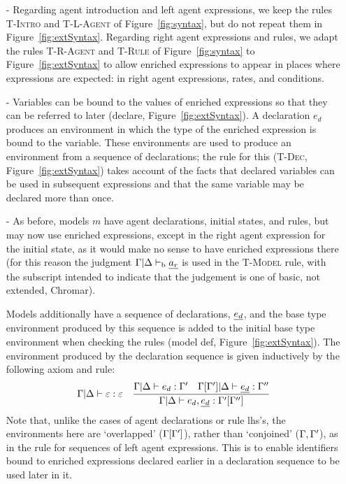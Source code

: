 \begin{itemize}

\item[-] Regarding agent introduction and left agent expressions, we keep the
  rules \textsc{T-Intro} and \textsc{T-L-Agent} of Figure~\ref{fig:syntax}, but
  do not repeat them in Figure~\ref{fig:extSyntax}. Regarding right agent
  expressions and rules, we adapt the rules \textsc{T-R-Agent} and
  \textsc{T-Rule} of Figure~\ref{fig:syntax} to Figure~\ref{fig:extSyntax} to
  allow enriched expressions to appear in places where expressions are expected:
  in right agent expressions, rates, and conditions.

\item[-] Variables can be bound to the values of enriched expressions so that
  they can be referred to later (\textsf{declare}, Figure~\ref{fig:extSyntax}).
  A declaration $e_d$ produces an environment in which the type of the enriched
  expression is bound to the variable. These environments are used to produce an
  environment from a sequence of declarations; the rule for this
  (\textsc{T-Dec}, Figure~\ref{fig:extSyntax}) takes account of the facts that
  declared variables can be used in subsequent expressions and that the same
  variable may be declared more than once.
%
\item[-] As before, models $m$ have agent declarations, initial states, and
  rules, but may now use enriched expressions, except in the right agent
  expression for the initial state, as it would make no sense to have enriched
  expressions there (for this reason the judgment
  $\Gamma | \Delta \vdash_{\mathrm{b}} \underline{a_r}$ is used in the \textsc{T-Model} rule, with the
  subscript intended to indicate that the judgement is one of basic, not
  extended, Chromar).

  Models additionally have a sequence of declarations, $\underline{e_d}$, and the base
  type environment produced by this sequence is added to the initial base type
  environment when checking the rules (\textsf{model def},
  Figure~\ref{fig:extSyntax}).  The environment produced by the declaration
  sequence is given inductively by the following axiom and rule:
%
\[\Gamma|\Delta\vdash \varepsilon:\varepsilon \quad \frac{
\Gamma | \Delta \vdash e_d: \Gamma' \quad\Gamma[\Gamma'] | \Delta \vdash \underline{e_d}:\Gamma''}{\Gamma | \Delta \vdash e_d, \underline{e_d}: \Gamma'[\Gamma'']}\]
%
Note that, unlike the cases of agent declarations or rule lhs's, the
environments here are `overlapped' ($\Gamma[\Gamma']$), rather than `conjoined'
($\Gamma,\Gamma'$), as in the rule for sequences of left agent expressions. This is to
enable identifiers bound to enriched expressions declared earlier in a
declaration sequence to be used later in it.
\end{itemize}

